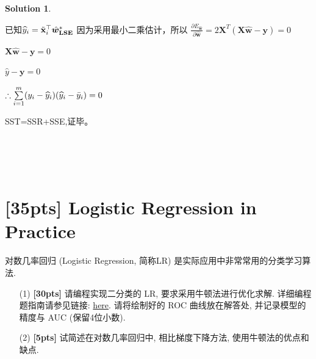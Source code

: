 \documentclass[a4paper,UTF8]{article}
\numberwithin{equation}{section}
\theoremstyle{definition}
\newtheorem*{solution}{Solution}
\def \X {\mathbf{X}}
\def \w {\hat{\boldsymbol{w}}}
\def \y {\mathbf{y}}
\def \x {\mathbf{x}}
\def \hy {\widehat{y}}
\def \by {\Bar{y}}
\begin{document}
\begin{solution}
\begin{enumerate}
				已知$\hy_i = \Tilde{\x}_i^\top \w_{\textbf{LSE}}^*$
				因为采用最小二乘估计，所以
						$\frac{\partial E_{\w}}{\partial \w} = 2\X^{T}(\X\w-\y) = 0 $

						$\X\w-\y=0 $

						$\hy-\y = 0 $

				$\therefore \sum\limits_{i=1}^{m}(y_i-\hy_i)(\hy_i-\by_i)=0$

				SST=SSR+SSE,证毕。
		\end{enumerate}
		~\\
		~\\
		~\\
	\end{solution}
	
	\newpage
	\section{[35pts] Logistic Regression in Practice}
	对数几率回归 (Logistic Regression, 简称LR) 是实际应用中非常常用的分类学习算法.
	\begin{enumerate}
		\item[(1)]  \textbf{[30pts]} 请编程实现二分类的 LR, 要求采用牛顿法进行优化求解. 详细编程题指南请参见链接: \href{https://www.lamda.nju.edu.cn/ML2023Spring/homework/hw1/hw1-code.html}{here}. 请将绘制好的 ROC 曲线放在解答处, 并记录模型的精度与 AUC (保留4位小数).
		\item[(2)]  \textbf{[5pts]} 试简述在对数几率回归中, 相比梯度下降方法, 使用牛顿法的优点和缺点.
	\end{enumerate}
	
\end{document}
